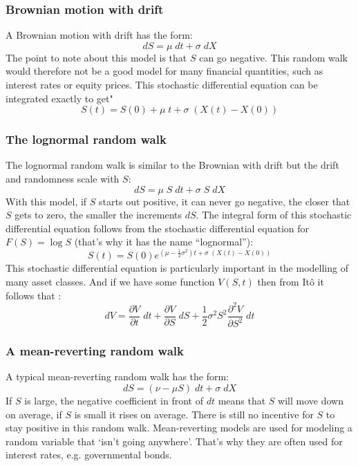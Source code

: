 \subsubsection{Brownian motion with drift}
A Brownian motion with drift has the form:
\begin{equation}
    dS = \mu \; dt + \sigma \; dX
\end{equation}
The point to note about this model is that $S$ can go negative. This random walk would therefore not be a good model for many financial quantities, such as interest rates or equity prices. This stochastic differential equation can be integrated exactly to get"
\begin{equation}
    S(t) = S(0) + \mu \; t + \sigma \; (X(t) - X(0))
\end{equation}



\subsubsection{The lognormal random walk}
The lognormal random walk is similar to the Brownian with drift but the drift and randomness scale with $S$:
\begin{equation}
    dS = \mu \; S \; dt + \sigma \; S \; dX
\end{equation}
With this model, if $S$ starts out positive, it can never go negative, the closer that $S$ gets to zero, the smaller the increments $dS$. The integral form of this stochastic differential equation follows from the stochastic differential equation for $F(S) = \log S$ (that's why it has the name ``lognormal''):
\begin{equation}
    S(t) = S(0) e^{\left( \mu - \frac{1}{2}\sigma^2 \right)t + \sigma \; (X(t) - X(0))}
\end{equation}
This stochastic differential equation is particularly important in the modelling of many asset classes. And if we have some function $V(S, t)$ then from Itô it follows that :
\begin{equation}
    dV = \frac{\partial V}{\partial t} \; dt + \frac{\partial V}{\partial S} \; dS + \frac{1}{2} \sigma^2 S^2 \frac{\partial^2 V}{\partial S^2} \; dt
\end{equation}



\subsubsection{A mean-reverting random walk}
A typical mean-reverting random walk has the form:
\begin{equation}
    dS = (\nu - \mu S) \; dt + \sigma \; dX
\end{equation}
If $S$ is large, the negative coefficient in front of $dt$ means that $S$ will move down on average, if $S$ is small it rises on average. There is still no incentive for $S$ to stay positive in this random walk. Mean-reverting models are used for modeling a random variable that `isn't going anywhere'. That's why they are often used for interest rates, e.g. governmental bonds.



